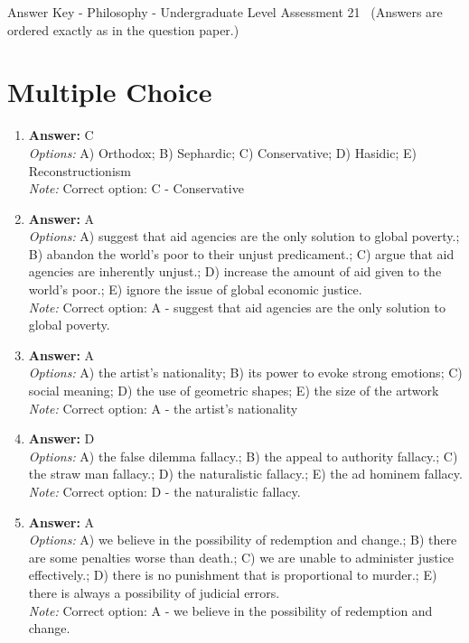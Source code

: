 \documentclass[12pt]{article}
\begin{document}
\begin{center}
Answer Key - Philosophy - Undergraduate Level Assessment 21 \
\small (Answers are ordered exactly as in the question paper.)
\end{center}

\section*{Multiple Choice}
\begin{enumerate}[label=\arabic*.]
\item \textbf{Answer:} C
\\ \textit{Options:} A) Orthodox; B) Sephardic; C) Conservative; D) Hasidic; E) Reconstructionism
\\ \textit{Note:} Correct option: C - Conservative
\item \textbf{Answer:} A
\\ \textit{Options:} A) suggest that aid agencies are the only solution to global poverty.; B) abandon the world's poor to their unjust predicament.; C) argue that aid agencies are inherently unjust.; D) increase the amount of aid given to the world's poor.; E) ignore the issue of global economic justice.
\\ \textit{Note:} Correct option: A - suggest that aid agencies are the only solution to global poverty.
\item \textbf{Answer:} A
\\ \textit{Options:} A) the artist's nationality; B) its power to evoke strong emotions; C) social meaning; D) the use of geometric shapes; E) the size of the artwork
\\ \textit{Note:} Correct option: A - the artist's nationality
\item \textbf{Answer:} D
\\ \textit{Options:} A) the false dilemma fallacy.; B) the appeal to authority fallacy.; C) the straw man fallacy.; D) the naturalistic fallacy.; E) the ad hominem fallacy.
\\ \textit{Note:} Correct option: D - the naturalistic fallacy.
\item \textbf{Answer:} A
\\ \textit{Options:} A) we believe in the possibility of redemption and change.; B) there are some penalties worse than death.; C) we are unable to administer justice effectively.; D) there is no punishment that is proportional to murder.; E) there is always a possibility of judicial errors.
\\ \textit{Note:} Correct option: A - we believe in the possibility of redemption and change.
\end{enumerate}
\end{document}
